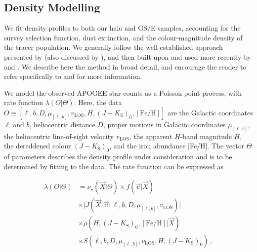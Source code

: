 \subsection{Density Modelling}

We fit density profiles to both our halo and GS/E samples, accounting for the survey selection function, dust extinction, and the colour-magnitude density of the tracer population. We generally follow the well-established approach presented by \textcite{bovy12d} (also discussed by \textcite{rix13}), and then built upon and used more recently by \textcite{bovy16a,bovy16b,mackereth17,horta21b} and \cite{mackereth20}. We describe here the method in broad detail, and encourage the reader to refer specifically to \textcite{bovy12d,bovy16a} and \cite{mackereth20} for more information.

We model the observed APOGEE star counts as a Poisson point process, with rate function $\lambda(O \vert \Theta)$. Here, the data $O \equiv [\ell, b, D, \mu_{[\ell,b]}, v_\mathrm{LOS}, H, (J-K_\mathrm{S})_{0}, [\mathrm{Fe/H}]]$ are the Galactic coordinates $\ell$ and $b$, heliocentric distance $D$, proper motions in Galactic coordinates $\mu_{[\ell,b]}$, the heliocentric line-of-sight velocity $v_\mathrm{LOS}$, the apparent $H$-band magnitude $H$, the dereddened colour $(J-K_\mathrm{S})_{0}$, and the iron abundance [Fe/H]. The vector $\Theta$ of parameters describes the density profile under consideration and is to be determined by fitting to the data. The rate function can be expressed as

\begin{equation}
\label{ch3:eq:rate}
\begin{split}
	\lambda(O \vert \Theta) & = \nu_{\star}(\vec{X} \vert \Theta) \times f(\vec{v} \vert \vec{X}) \\
	& \times \vert J(\vec{X}, \vec{v}; \ell, b, D, \mu_{[\ell,b]}, v_\mathrm{LOS}) \vert \\
	& \times \rho(H, (J-K_\mathrm{S})_{0}, [\mathrm{Fe/H}] \vert \vec{X}) \\
	& \times S(\ell, b, D, \mu_{[\ell,b]}, v_\mathrm{LOS}, H, (J-K_\mathrm{S})_{0})\,,
\end{split}
\end{equation}

